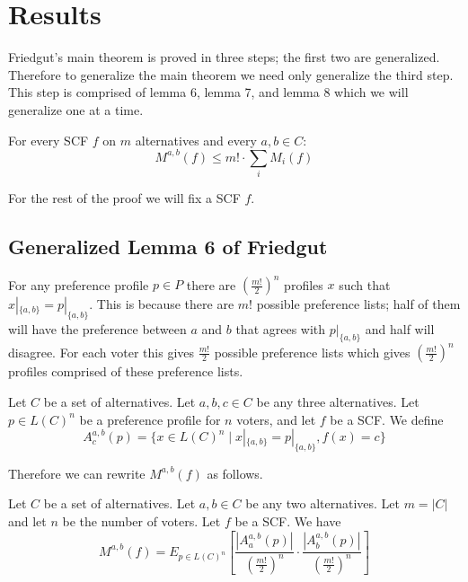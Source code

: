 
\chapter{Results}

	Friedgut's main theorem is proved in three steps; the first two are generalized. Therefore to generalize the main theorem we need only generalize the third step. This step is comprised of lemma 6, lemma 7, and lemma 8 which we will generalize one at a time.

	\begin{lemma}
		For every SCF $f$ on $m$ alternatives and every $a, b \in C$:
		\[
			M^{a, b}(f) \le m! \cdot \sum_i M_i(f)
		\]
	\end{lemma}

	For the rest of the proof we will fix a SCF $f$.


\section{Generalized Lemma 6 of Friedgut}

	For any preference profile $p \in P$ there are $(\frac{m!}{2})^n$ profiles $x$ such that $x|_{\{a, b\}} = p|_{\{a, b\}}$. This is because there are $m!$ possible preference lists; half of them will have the preference between $a$ and $b$ that agrees with $p|_{\{a, b\}}$ and half will disagree. For each voter this gives $\frac{m!}{2}$ possible preference lists which gives $(\frac{m!}{2})^n$ profiles comprised of these preference lists.

	\begin{definition}
		Let $C$ be a set of alternatives. Let $a, b, c \in C$ be any three alternatives. Let $p \in L(C)^n$ be a preference profile for $n$ voters, and let $f$ be a SCF. We define
		\[
			A^{a,b}_c(p) = \{x \in L(C)^n \mid x|_{\{a,b\}} = p|_{\{a,b\}}, f(x) = c\}
		\]
	\end{definition}

	Therefore we can rewrite $M^{a,b}(f)$ as follows.

	\begin{lemma} Let $C$ be a set of alternatives. Let $a, b \in C$ be any two alternatives. Let $m = |C|$ and let $n$ be the number of voters. Let $f$ be a SCF. We have
		\[
			M^{a,b}(f) = E_{p \in L(C)^n} \left[ \frac{|A^{a,b}_a(p)|}{\left(\frac{m!}{2}\right)^n} \cdot \frac{|A^{a,b}_b(p)|}{\left(\frac{m!}{2}\right)^n} \right]
		\]
	\end{lemma}


